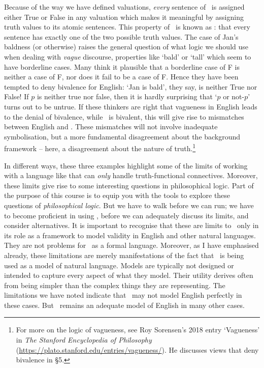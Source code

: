Because of the way we have defined valuations, \emph{every} sentence of \TFL\ is assigned either True or False in any valuation which makes it meaningful by assigning truth values to its atomic sentences. This property of \TFL\ is known as : that every sentence has exactly one of the two possible truth values. The case of Jan's baldness (or otherwise) raises the general question of what logic we should use when dealing with \emph{vague} discourse, properties like `bald' or `tall' which seem to have borderline cases. Many think it plausible that a borderline case of F is neither a case of F, nor does it fail to be a case of F. Hence they have been tempted to deny bivalence for English: `Jan is bald', they say, is neither True nor False! If $p$ is neither true nor false, then it is hardly surprising that `$p$ or not-$p$' turns out to be untrue. If these thinkers are right that vagueness in English leads to the denial of bivalence, while \TFL\ is bivalent, this will give rise to mismatches between English and \TFL. These mismatches will not involve inadequate symbolisation, but a more fundamental disagreement about the background framework – here, a disagreement about the nature of truth.\footnote{For more on the logic of vagueness, see Roy Sorensen's 2018 entry `Vagueness' in \emph{The Stanford Encyclopedia of Philosophy} (\url{https://plato.stanford.edu/entries/vagueness/}). He discusses views that deny bivalence in §5.} 

In different ways, these three examples highlight some of the limits of working with a language like \TFL that can \emph{only} handle truth-functional connectives. Moreover, these limits give rise to some interesting questions in philosophical logic. Part of the purpose of this course is to equip you with the tools to explore these questions of \emph{philosophical logic}. But we have to walk before we can run; we have to become proficient in using \TFL, before we can adequately discuss its limits, and consider alternatives. It is important to recognise that these are limits to \TFL\ only in its role as a framework to model validity in English and other natural languages. They are not problems for \TFL\ as a formal language. Moreover, as I have emphasised already, these limitations are merely manifestations of the fact that \TFL\ is being used as a model of natural language. Models are typically not designed or intended to capture every aspect of what they model. Their utility derives often from being simpler than the complex things they are representing. The limitations we have noted indicate that \TFL\ may not model English perfectly in these cases. But \TFL\ remains an adequate model of English in many other cases.  



